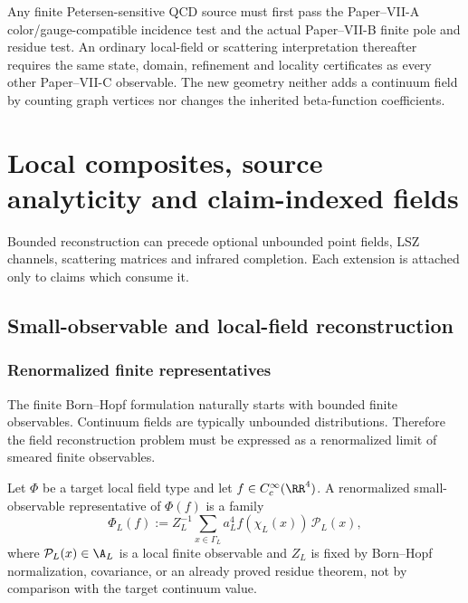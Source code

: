 \documentclass[12pt,a4paper]{article}
\begin{document}
\begin{corollary}
\label{p12:cor:v323-petersen-handoff}
Any finite Petersen-sensitive QCD source must first pass the
Paper--VII-A color/gauge-compatible incidence test and the actual
Paper--VII-B finite pole and residue test.  An ordinary local-field or
scattering interpretation thereafter requires the same state, domain,
refinement and locality certificates as every other Paper--VII-C
observable.  The new geometry neither adds a continuum field by
counting graph vertices nor changes the inherited beta-function
coefficients.
\end{corollary}


\section{Local composites, source analyticity and claim-indexed fields}
\label{p12:sec:v237-c7}
Bounded reconstruction can precede optional unbounded point fields, LSZ channels, scattering matrices and infrared completion. Each extension is attached only to claims which consume it.

\subsection{Small-observable and local-field reconstruction}
\label{p12:sec:small-field-reconstruction}


\subsubsection{Renormalized finite representatives}
\label{p12:sec:renormalized-finite-representatives}

The finite Born--Hopf formulation naturally starts with bounded finite observables.  Continuum fields are typically unbounded distributions.  Therefore the field reconstruction problem must be expressed as a renormalized limit of smeared finite observables.

\begin{definition}
\label{p12:def:small-observable-family}
Let \(\Phi\) be a target local field type and let \(f\in C_c^\infty(\RR^4)\).  A renormalized small-observable representative of \(\Phi(f)\) is a family
\begin{equation}
\label{p12:eq:renormalized-small-observable}
\Phi_L(f)
:=
Z_L^{-1}\sum_{x\in\Gamma_L} a_L^4 f(\chi_L(x))\,\mathcal P_L(x),
\end{equation}
where \(\mathcal P_L(x)\in\A_L\) is a local finite observable and \(Z_L\) is fixed by Born--Hopf normalization, covariance, or an already proved residue theorem, not by comparison with the target continuum value.
\end{definition}
\end{document}
